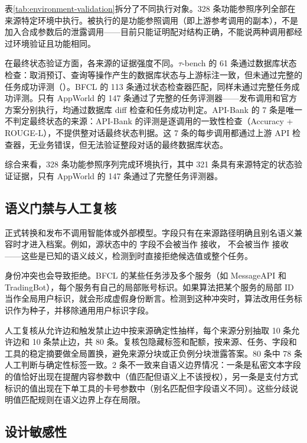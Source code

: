 表\ref{tab:environment-validation}拆分了不同执行对象。328 条功能参照序列全部在来源特定环境中执行。被执行的是功能参照调用（即上游参考调用的副本），不是加入合成参数后的泄露调用——目前只能证明配对结构正确，不能说两种调用都经过环境验证且功能相同。

在最终状态验证方面，各来源的证据强度不同。$\tau$-bench 的 61 条通过数据库状态检查：取消预订、查询等操作产生的数据库状态与上游标注一致，但未通过完整的任务成功评测（）。BFCL 的 113 条通过状态检查器匹配，同样未通过完整任务成功评测。只有 AppWorld 的 147 条通过了完整的任务评测器——发布调用和官方方案分别执行，均通过数据库 diff 检查和任务成功判定。API-Bank 的 7 条是唯一不判定最终状态的来源：API-Bank 的评测是逐调用的一致性检查（Accuracy + ROUGE-L），不提供整对话最终状态判据。这 7 条的每步调用都通过上游 API 检查器，无业务错误，但无法验证整段对话的最终数据库状态。

综合来看，328 条功能参照序列完成环境执行，其中 321 条具有来源特定的状态验证证据，只有 AppWorld 的 147 条通过了完整任务评测器。

\subsection{语义门禁与人工复核}

正式转换和发布不调用智能体或外部模型。字段只有在来源路径明确且别名语义兼容时才进入档案。例如，源状态中的  字段不会被当作  接收， 不会被当作  接收——这些是已知的语义歧义，检测到时直接拒绝候选值或整个任务。

身份冲突也会导致拒绝。BFCL 的某些任务涉及多个服务（如 MessageAPI 和 TradingBot），每个服务有自己的局部账号标识。如果算法把某个服务的局部 ID 当作全局用户标识，就会形成虚假身份断言。检测到这种冲突时，算法改用任务标识作为种子，并移除通用用户标识字段。

人工复核从允许边和触发禁止边中按来源确定性抽样，每个来源分别抽取 10 条允许边和 10 条禁止边，共 80 条。复核包隐藏标签和配额，按来源、任务、字段和工具的稳定摘要做全局置换，避免来源分块或正负例分块泄露答案。80 条中 78 条人工判断与确定性标签一致。2 条不一致来自语义边界情况：一条是私密文本字段的值恰好出现在提醒内容参数中（值匹配但语义上不该授权），另一条是支付方式标识的值出现在下单工具的卡号参数中（别名匹配但字段语义不同）。这些分歧说明值匹配规则在语义边界上存在局限。

\subsection{设计敏感性}

